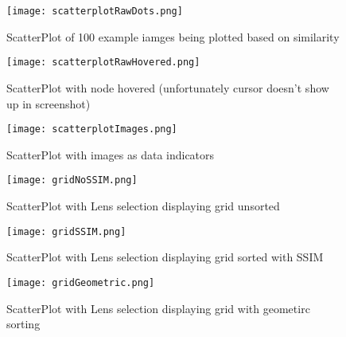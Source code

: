 \documentclass[
  a4paper,  %
  twoside,  %
  bibliography=totoc,
  headsepline,
  cleardoublepage=empty,
  parskip=half,
  draft=false
]{scrbook}
\begin{document}
\begin{figure}[H]
	\centering
	\texttt{[image: scatterplotRawDots.png]}
	\caption{ScatterPlot of 100 example iamges being plotted based on similarity }
	\label{fig:scatterDots}
\end{figure}
\begin{figure}[H]
	\centering
	\texttt{[image: scatterplotRawHovered.png]}
	\caption{ScatterPlot with node hovered (unfortunately cursor doesn't show up in screenshot) }
	\label{fig:scatterHovered}
\end{figure}
\begin{figure}[H]
	\centering
	\texttt{[image: scatterplotImages.png]}
	\caption{ScatterPlot with images as data indicators  }
	\label{fig:scatterImages}
\end{figure}
\begin{figure}[H]
	\centering
	\texttt{[image: gridNoSSIM.png]}
	\caption{ScatterPlot with Lens selection displaying grid unsorted }
	\label{fig:scatterNoSSIM}
\end{figure}
\begin{figure}[H]
	\centering
	\texttt{[image: gridSSIM.png]}
	\caption{ScatterPlot with Lens selection displaying grid sorted with SSIM}
	\label{fig:scatterSSIM}
\end{figure}
\begin{figure}[H]
	\centering
	\texttt{[image: gridGeometric.png]}
	\caption{ScatterPlot with Lens selection displaying grid with geometirc sorting}
	\label{fig:scatterNoSSIM}
\end{figure}
\end{document}
